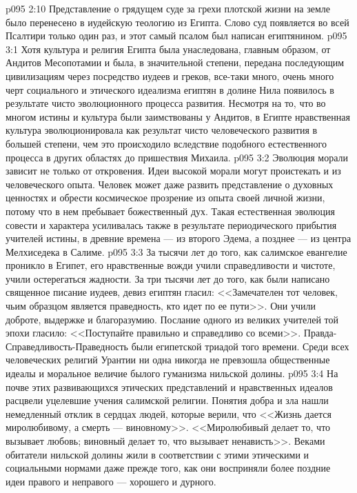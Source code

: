 \vs p095 2:10 Представление о грядущем суде за грехи плотской жизни на земле было перенесено в иудейскую теологию из Египта. Слово суд появляется во всей Псалтири только один раз, и этот самый псалом был написан египтянином.
\vs p095 3:1 Хотя культура и религия Египта была унаследована, главным образом, от Андитов Месопотамии и была, в значительной степени, передана последующим цивилизациям через посредство иудеев и греков, все\hyp{}таки много, очень много черт социального и этического идеализма египтян в долине Нила появилось в результате чисто эволюционного процесса развития. Несмотря на то, что во многом истины и культура были заимствованы у Андитов, в Египте нравственная культура эволюционировала как результат чисто человеческого развития в большей степени, чем это происходило вследствие подобного естественного процесса в других областях до пришествия Михаила.
\vs p095 3:2 Эволюция морали зависит не только от откровения. Идеи высокой морали могут проистекать и из человеческого опыта. Человек может даже развить представление о духовных ценностях и обрести космическое прозрение из опыта своей личной жизни, потому что в нем пребывает божественный дух. Такая естественная эволюция совести и характера усиливалась также в результате периодического прибытия учителей истины, в древние времена --- из второго Эдема, а позднее --- из центра Мелхиседека в Салиме.
\vs p095 3:3 За тысячи лет до того, как салимское евангелие проникло в Египет, его нравственные вожди учили справедливости и чистоте, учили остерегаться жадности. За три тысячи лет до того, как были написано священное писание иудеев, девиз египтян гласил: <<Замечателен тот человек, чьим образцом является праведность, кто идет по ее пути>>. Они учили доброте, выдержке и благоразумию. Послание одного из великих учителей той эпохи гласило: <<Поступайте правильно и справедливо со всеми>>. Правда\hyp{}Справедливость\hyp{}Праведность были египетской триадой того времени. Среди всех человеческих религий Урантии ни одна никогда не превзошла общественные идеалы и моральное величие былого гуманизма нильской долины.
\vs p095 3:4 На почве этих развивающихся этических представлений и нравственных идеалов расцвели уцелевшие учения салимской религии. Понятия добра и зла нашли немедленный отклик в сердцах людей, которые верили, что <<Жизнь дается миролюбивому, а смерть --- виновному>>. <<Миролюбивый делает то, что вызывает любовь; виновный делает то, что вызывает ненависть>>. Веками обитатели нильской долины жили в соответствии с этими этическими и социальными нормами даже прежде того, как они восприняли более поздние идеи правого и неправого --- хорошего и дурного.

